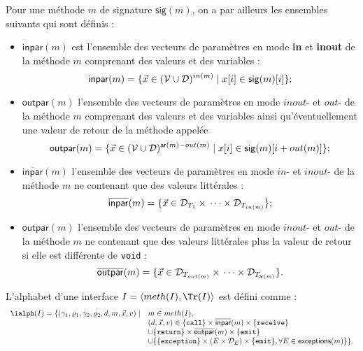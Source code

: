 Pour une m\'ethode $m$ de signature $\mathsf{sig}(m)$, on a par ailleurs les ensembles suivants qui
sont d\'efinis :
\begin{itemize}
  \item $ \mathsf{inpar}(m)$ est l'ensemble des vecteurs de param\`etres en mode
    \textbf{in} et \textbf{inout} de la m\'ethode $m$ comprenant des valeurs et
    des variables :
    $$
    \mathsf{inpar}(m) = \{ \vec{x} \in ({\cal V}\cup {\cal D})^{in(m)}
    \mid x[i] \in \mathsf{sig}(m)[i] \} ;
    $$
  \item $\mathsf{outpar}(m)$ l'ensemble des vecteurs de param\`etres en mode
    $inout$- et $out$- de la m\'ethode $m$ comprenant des valeurs et
    des variables ainsi qu'\'eventuellement une valeur de retour de
    la m\'ethode appel\'ee
    $$
    \mathsf{outpar}(m) = \{ \vec{x} \in ({\cal V}\cup {\cal D})^{\mathsf{ar}(m)-out(m)}
    \mid x[i] \in \mathsf{sig}(m)[i+out(m)] \} ;
    $$
  \item $\overline{\mathsf{inpar}}(m)$ l'ensemble des vecteurs de param\`etres en mode $in$- et
    $inout$- de la m\'ethode $m$ ne contenant que des valeurs
    litt\'erales :
    $$
    \overline{\mathsf{inpar}}(m) = \{ \vec{x} \in {\cal D}_{T_1}\times{}
    \dots \times{}{\cal D}_{T_{in(m)}}\} ;
    $$
  \item $\overline{\mathsf{outpar}}(m)$ l'ensemble des vecteurs de param\`etres en mode  $inout$- et 
    $out$- de la m\'ethode $m$ ne contenant que des valeurs
    litt\'erales plus la valeur de retour si
    elle est diff\'erente de \texttt{void} :
    $$
    \overline{\mathsf{outpar}}(m) = \{ \vec{x} \in {\cal D}_{T_{out(m)}}\times{}
    \dots \times{}{\cal D}_{T_{\mathsf{ar}(m)}}\}.
    $$
\end{itemize}

\begin{definition}
\label{def:alphinterface}
L'alphabet d'une interface $I =\langle meth(I),\Tr(I)\rangle$ est
d\'efini comme :
    $$
\begin{array}{rl}
\ialph(I) = \{(\gamma_1,\varrho_1,\gamma_2,\varrho_2,d,m,\vec{x},v) \mid & m \in
meth(I), \\
&(d,\vec{x},v) \in \{\mathtt{call}\} \times{}\overline{\mathsf{inpar}}(m) \times{}
\{\mathtt{receive}\} \\
&\cup \{\mathtt{return}\} \times{}\overline{\mathsf{outpar}}(m) \times{}
\{\mathtt{emit}\} \\
&\cup \{\{\mathtt{exception}\} \times{} (E \times{}{\cal D}_E) \times{}
\{\mathtt{emit}\}, \forall E \in \mathsf{exceptions}(m)\} \}.
\end{array}
$$
\end{definition}


